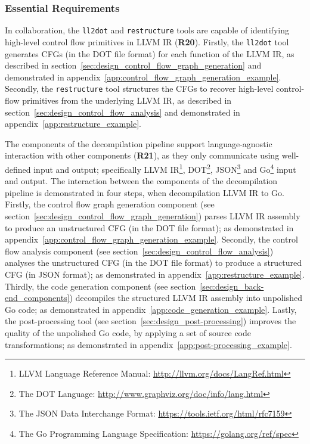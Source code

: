 
\subsubsection{Essential Requirements}
\label{sec:eval_control_flow_recovery_tool_essential_requirements}


In collaboration, the \texttt{ll2dot} and \texttt{restructure} tools are capable of identifying high-level control flow primitives in LLVM IR (\textbf{R20}). Firstly, the \texttt{ll2dot} tool generates CFGs (in the DOT file format) for each function of the LLVM IR, as described in section~\ref{sec:design_control_flow_graph_generation} and demonstrated in appendix~\ref{app:control_flow_graph_generation_example}. Secondly, the \texttt{restructure} tool structures the CFGs to recover high-level control-flow primitives from the underlying LLVM IR, as described in section~\ref{sec:design_control_flow_analysis} and demonstrated in appendix~\ref{app:restructure_example}.


The components of the decompilation pipeline support language-agnostic interaction with other components (\textbf{R21}), as they only communicate using well-defined input and output; specifically LLVM IR\footnote{LLVM Language Reference Manual: \url{http://llvm.org/docs/LangRef.html}}, DOT\footnote{The DOT Language: \url{http://www.graphviz.org/doc/info/lang.html}}, JSON\footnote{The JSON Data Interchange Format: \url{https://tools.ietf.org/html/rfc7159}} and Go\footnote{The Go Programming Language Specification: \url{https://golang.org/ref/spec}} input and output. The interaction between the components of the decompilation pipeline is demonstrated in four steps, when decompilation LLVM IR to Go. Firstly, the control flow graph generation component (see section~\ref{sec:design_control_flow_graph_generation}) parses LLVM IR assembly to produce an unstructured CFG (in the DOT file format); as demonstrated in appendix~\ref{app:control_flow_graph_generation_example}. Secondly, the control flow analysis component (see section~\ref{sec:design_control_flow_analysis}) analyses the unstructured CFG (in the DOT file format) to produce a structured CFG (in JSON format); as demonstrated in appendix~\ref{app:restructure_example}. Thirdly, the code generation component (see section~\ref{sec:design_back-end_components}) decompiles the structured LLVM IR assembly into unpolished Go code; as demonstrated in appendix~\ref{app:code_generation_example}. Lastly, the post-processing tool (see section~\ref{sec:design_post-processing}) improves the quality of the unpolished Go code, by applying a set of source code transformations; as demonstrated in appendix~\ref{app:post-processing_example}.
